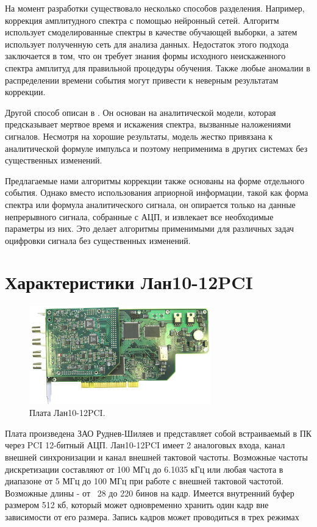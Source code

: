 \documentclass[a4paper,14pt]{extreport}
\begin{document}
На момент разработки существовало несколько способов разделения. Например, коррекция амплитудного спектра с помощью нейронный сетей\cite{2017JHEP...12..051K}. Алгоритм использует смоделированные спектры в качестве обучающей выборки, а затем использует полученную сеть для анализа данных. Недостаток этого подхода заключается в том, что он требует знания формы исходного неискаженного спектра амплитуд для правильной процедуры обучения. Также любые аномалии в распределении времени события могут привести к неверным результатам коррекции.

Другой способ описан в \cite{2013NIMPA.717...21C}. Он основан на аналитической модели, которая предсказывает мертвое время и искажения спектра, вызванные наложениями сигналов. Несмотря на хорошие результаты, модель жестко привязана к аналитической формуле импульса и поэтому неприменима в других системах без существенных изменений.

Предлагаемые нами алгоритмы коррекции также основаны на форме отдельного события. Однако вместо использования априорной информации, такой как форма спектра или формула аналитического сигнала, он опирается только на данные непрерывного сигнала, собранные с АЦП, и извлекает все необходимые параметры из них. Это делает алгоритмы применимыми для различных задач оцифровки сигнала без существенных изменений.

\section{Характеристики Лан10-12PCI}

\begin{figure}
  \centering
  \includegraphics[width = 0.7\textwidth]{img/signals/Lan10-12PCI.jpg}
    \caption{Плата Лан10-12PCI.}
    \label{fig:lan10-view}
\end{figure}

Плата произведена ЗАО {\textquotedbl}Руднев-Шиляев{\textquotedbl} и представляет собой встраиваемый в ПК через PCI 12-битный АЦП. Лан10-12PCI имеет 2 аналоговых входа, канал внешней синхронизации и канал внешней тактовой частоты. Возможные частоты дискретизации составляют от 100 МГц до 6.1035 кГц или любая частота в диапазоне от 5 МГц до 100 МГц при работе с внешней тактовой частотой. Возможные длины - от ~28 до 220 бинов на кадр. Имеется внутренний буфер размером 512 кб, который может одновременно хранить один кадр вне зависимости от его размера. Запись кадров может проводиться в трех режимах
\end{document}
